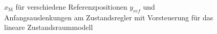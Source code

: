 \documentclass[
	pagesize,
	fontsize=12pt,
	paper=a4,
	oneside,
   reqno
]{scrartcl}
\begin{document}
\begin{figure}[H]
    \centering
    \caption[$x_{\mathrm{M}}$ für Regler mit Vorsteuerung (linear)]{$x_{\mathrm{M}}$ für verschiedene Referenzpositionen $y_{ref}$ und Anfangsauslenkungen am Zustandsregler mit Vorsteuerung für das lineare Zustandsraummodell}
    \label{fig:Bild16}
\end{figure}
\end{document}
